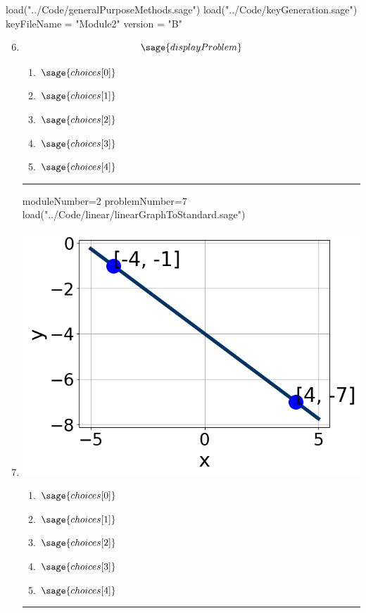 \documentclass[14pt]{article}
\newcommand{\litem}[1]{\item#1\hspace*{-1cm}\rule{\textwidth}{0.4pt}}
\begin{document}
\pagestyle{fancy}

\begin{sagesilent}
load("../Code/generalPurposeMethods.sage")
load("../Code/keyGeneration.sage")
keyFileName = "Module2"
version = "B"
\end{sagesilent}

\begin{enumerate}
\setcounter{enumi}{5}


\begin{sagesilent}
moduleNumber=2
problemNumber=6
load("../Code/linear/solveRationalLinear.sage")
\end{sagesilent}

\litem{ 

 \[ \sage{displayProblem} \]

	\begin{enumerate}[label=\Alph*.]
    \item \( \sage{choices[0]} \)
    \item \( \sage{choices[1]} \)
    \item \( \sage{choices[2]} \)
    \item \( \sage{choices[3]} \)
    \item \( \sage{choices[4]} \)
	\end{enumerate}

}

\begin{sagesilent}
moduleNumber=2
problemNumber=7
load("../Code/linear/linearGraphToStandard.sage")
\end{sagesilent}

\litem{ 

	\begin{center}
	 \includegraphics[width=.3\textwidth]{../Figures/linearGraphToStandardB.png}
	 \end{center}

	\begin{enumerate}[label=\Alph*.]
    \item \( \sage{choices[0]} \)
    \item \( \sage{choices[1]} \)
    \item \( \sage{choices[2]} \)
    \item \( \sage{choices[3]} \)
    \item \( \sage{choices[4]} \)
	\end{enumerate}

}
\end{enumerate}
\end{document}

